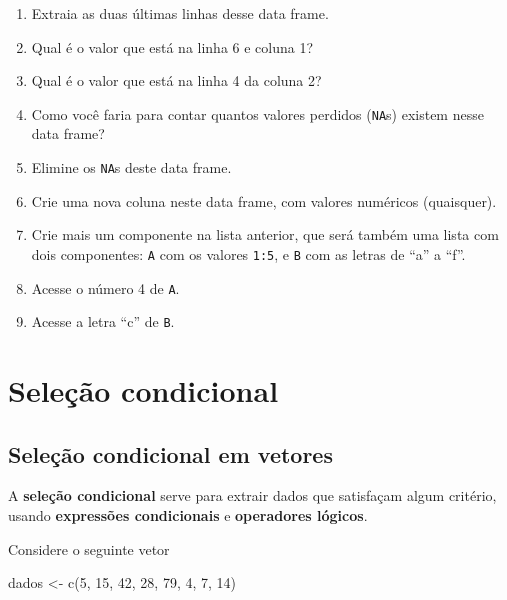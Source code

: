 \documentclass[
  10pt,
  a4paper]{book}
\newenvironment{Shaded}{\begin{snugshade}}{\end{snugshade}}
\newcommand{\DecValTok}[1]{\textcolor[rgb]{0.00,0.00,0.81}{#1}}
\newcommand{\FunctionTok}[1]{\textcolor[rgb]{0.00,0.00,0.00}{#1}}
\newcommand{\NormalTok}[1]{#1}
\newcommand{\OtherTok}[1]{\textcolor[rgb]{0.56,0.35,0.01}{#1}}
\begin{document}
\begin{enumerate}
\item
  Extraia as duas últimas linhas desse data frame.
\item
  Qual é o valor que está na linha 6 e coluna 1?
\item
  Qual é o valor que está na linha 4 da coluna 2?
\item
  Como você faria para contar quantos valores perdidos (\texttt{NA}s) existem
  nesse data frame?
\item
  Elimine os \texttt{NA}s deste data frame.
\item
  Crie uma nova coluna neste data frame, com valores numéricos
  (quaisquer).
\item
  Crie mais um componente na lista anterior, que será também uma lista
  com dois componentes: \texttt{A} com os valores \texttt{1:5}, e \texttt{B} com as letras
  de ``a'' a ``f''.
\item
  Acesse o número 4 de \texttt{A}.
\item
  Acesse a letra ``c'' de \texttt{B}.
\end{enumerate}

\hypertarget{seleuxe7uxe3o-condicional}{%
\section{Seleção condicional}\label{seleuxe7uxe3o-condicional}}

\hypertarget{seleuxe7uxe3o-condicional-em-vetores}{%
\subsection{Seleção condicional em vetores}\label{seleuxe7uxe3o-condicional-em-vetores}}

A \textbf{seleção condicional} serve para extrair dados que satisfaçam
algum critério, usando \textbf{expressões condicionais} e \textbf{operadores
lógicos}.

Considere o seguinte vetor

\begin{Shaded}
\begin{Highlighting}[]
\NormalTok{dados }\OtherTok{\textless{}{-}} \FunctionTok{c}\NormalTok{(}\DecValTok{5}\NormalTok{, }\DecValTok{15}\NormalTok{, }\DecValTok{42}\NormalTok{, }\DecValTok{28}\NormalTok{, }\DecValTok{79}\NormalTok{, }\DecValTok{4}\NormalTok{, }\DecValTok{7}\NormalTok{, }\DecValTok{14}\NormalTok{)}
\end{Highlighting}
\end{Shaded}
\end{document}
